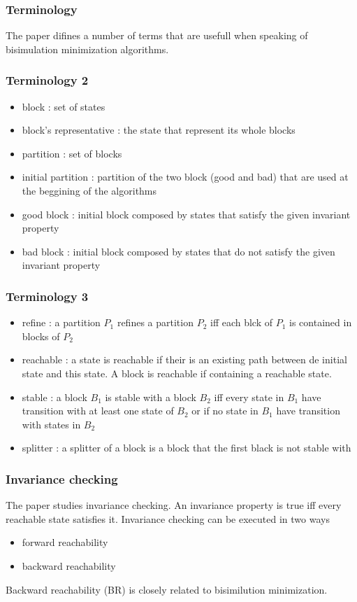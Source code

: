 \documentclass[11pt,handout]{beamer}
\begin{document}
\begin{frame}
 \frametitle{Terminology}
 The paper difines a number of terms that are usefull when speaking of bisimulation minimization algorithms.
\end{frame}

\begin{frame}
 \frametitle{Terminology 2}
 \begin{itemize}
  \item block : set of states
  \item block's representative : the state that represent its whole blocks
  \item partition : set of blocks
  \item initial partition : partition of the two block (good and bad) that are used at the beggining of the algorithms
  \item good block : initial block composed by states that satisfy the given invariant property
  \item bad block : initial block composed by states that do not satisfy the given invariant property
 \end{itemize}
\end{frame}

\begin{frame}
 \frametitle{Terminology 3}
 \begin{itemize}
  \item refine : a partition $P_1$ refines a partition $P_2$ iff each blck of $P_1$ is contained in blocks of $P_2$
  \item reachable : a state is reachable if their is an existing path between de initial state and this state. A block is reachable if containing a reachable state.
  \item stable : a block $B_1$ is stable with a block $B_2$ iff every state in $B_1$ have transition with at least one state of $B_2$ or if no state in $B_1$ have transition with states in $B_2$
  \item splitter : a splitter of a block is a block that the first black is not stable with
 \end{itemize}
\end{frame}

\begin{frame}
 \frametitle{Invariance checking}
 The paper studies invariance checking. An invariance property is true iff every reachable state satisfies it.
 Invariance checking can be executed in two ways
 \begin{itemize}
  \item forward reachability
  \item backward reachability
 \end{itemize}
 Backward reachability (BR) is closely related to bisimilution minimization. 
\end{frame}
\end{document}
